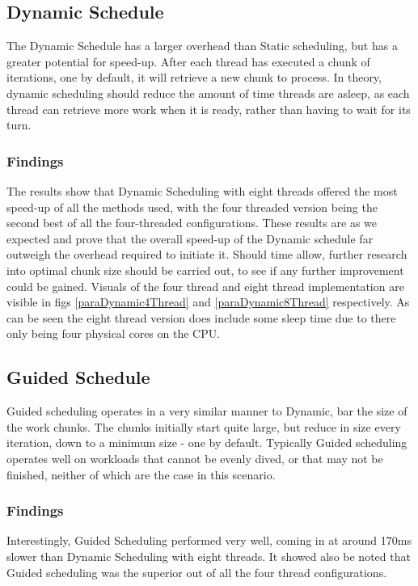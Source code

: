 \documentclass[journal,transmag]{IEEEtran}
\begin{document}
	\subsection{Dynamic Schedule}
		The Dynamic Schedule has a larger overhead than Static scheduling, but has a greater potential for speed-up. After each thread has executed a chunk of iterations, one by default, it will retrieve a new chunk to process. In theory, dynamic scheduling should reduce the amount of time threads are asleep, as each thread can retrieve more work when it is ready, rather than having to wait for its turn.
		\subsubsection{Findings}
			The results show that Dynamic Scheduling with eight threads offered the most speed-up of all the methods used, with the four threaded version being the second best of all the four-threaded configurations. These results are as we expected and prove that the overall speed-up of the Dynamic schedule far outweigh the overhead required to initiate it. Should time allow, further research into optimal chunk size should be carried out, to see if any further improvement could be gained.
			Visuals of the four thread and eight thread implementation are visible in figs \ref{paraDynamic4Thread} and \ref{paraDynamic8Thread} respectively. As can be seen the eight thread version does include some sleep time due to there only being four physical cores on the CPU.
	
	\subsection{Guided Schedule}
		Guided scheduling operates in a very similar manner to Dynamic, bar the size of the work chunks. The chunks initially start quite large, but reduce in size every iteration, down to a minimum size - one by default. Typically Guided scheduling operates well on workloads that cannot be evenly dived, or that may not be finished, neither of which are the case in this scenario.
		\subsubsection{Findings}
		Interestingly, Guided Scheduling performed very well, coming in at around 170ms slower than Dynamic Scheduling with eight threads. It showed also be noted that Guided scheduling was the superior out of all the four thread configurations. 
	
\end{document}
